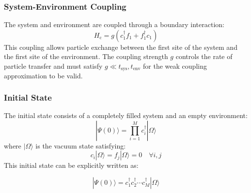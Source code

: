 \documentclass[12pt,oneside,openright]{report}
\theoremstyle{definition}
\theoremstyle{plain}
\theoremstyle{remark}
\newcommand{\beq}{\begin{equation}}
\newcommand{\eeq}{\end{equation}}
\begin{document}
\subsubsection{System-Environment Coupling}

The system and environment are coupled through a boundary interaction:
\beq
H_\mathrm{c} = g \left( c^\dagger_1 f_1 + f^\dagger_1 c_1 \right)
\label{eq:H_coupling}
\eeq
This coupling allows particle exchange between the first site of the system and the first site of the environment. The coupling strength $g$ controls the rate of particle transfer and must satisfy $g \ll t_\mathrm{sys}, t_\mathrm{env}$ for the weak coupling approximation to be valid.


\subsubsection{Initial State}
The initial state consists of a completely filled system and an empty environment:
\beq
|\Psi(0)\rangle = \prod_{i=1}^M c^\dagger_i |\Omega\rangle
\label{eq:initial_state}
\eeq
where $|\Omega\rangle$ is the vacuum state satisfying:
\beq
c_i |\Omega\rangle = f_j |\Omega\rangle = 0 \quad \forall i,j
\label{eq:vacuum_conditions}
\eeq
This initial state can be explicitly written as:

\beq
|\Psi(0)\rangle = c^\dagger_1 c^\dagger_2 \cdots c^\dagger_M |\Omega\rangle
\label{eq:initial_state_explicit}
\eeq
\end{document}
